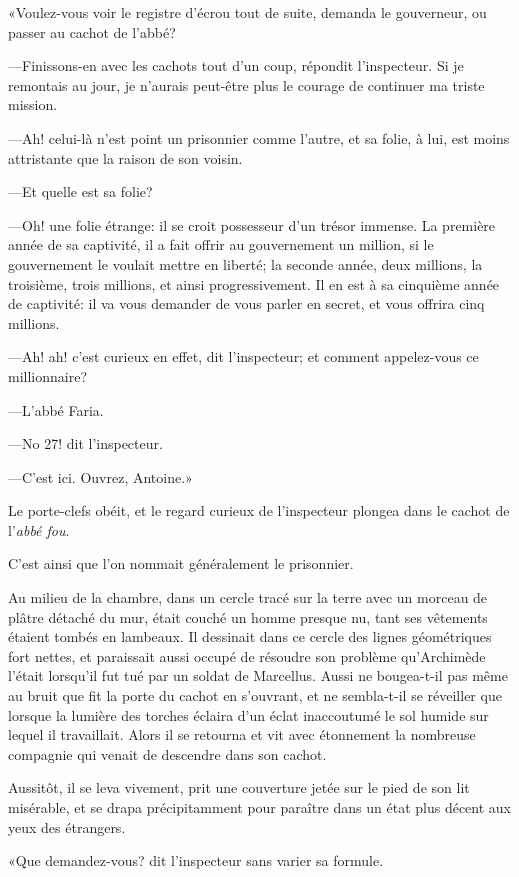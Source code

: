 «Voulez-vous voir le registre d'écrou tout de suite, demanda le gouverneur, ou passer au cachot de l'abbé?

—Finissons-en avec les cachots tout d'un coup, répondit l'inspecteur. Si je remontais au jour, je n'aurais peut-être plus le courage de continuer ma triste mission.

—Ah! celui-là n'est point un prisonnier comme l'autre, et sa folie, à lui, est moins attristante que la raison de son voisin.

—Et quelle est sa folie?

—Oh! une folie étrange: il se croit possesseur d'un trésor immense. La première année de sa captivité, il a fait offrir au gouvernement un million, si le gouvernement le voulait mettre en liberté; la seconde année, deux millions, la troisième, trois millions, et ainsi progressivement. Il en est à sa cinquième année de captivité: il va vous demander de vous parler en secret, et vous offrira cinq millions.

—Ah! ah! c'est curieux en effet, dit l'inspecteur; et comment appelez-vous ce millionnaire?

—L'abbé Faria.

—No 27! dit l'inspecteur.

—C'est ici. Ouvrez, Antoine.»

Le porte-clefs obéit, et le regard curieux de l'inspecteur plongea dans le cachot de l'\textit{abbé fou}.

C'est ainsi que l'on nommait généralement le prisonnier.

Au milieu de la chambre, dans un cercle tracé sur la terre avec un morceau de plâtre détaché du mur, était couché un homme presque nu, tant ses vêtements étaient tombés en lambeaux. Il dessinait dans ce cercle des lignes géométriques fort nettes, et paraissait aussi occupé de résoudre son problème qu'Archimède l'était lorsqu'il fut tué par un soldat de Marcellus. Aussi ne bougea-t-il pas même au bruit que fit la porte du cachot en s'ouvrant, et ne sembla-t-il se réveiller que lorsque la lumière des torches éclaira d'un éclat inaccoutumé le sol humide sur lequel il travaillait. Alors il se retourna et vit avec étonnement la nombreuse compagnie qui venait de descendre dans son cachot.

Aussitôt, il se leva vivement, prit une couverture jetée sur le pied de son lit misérable, et se drapa précipitamment pour paraître dans un état plus décent aux yeux des étrangers.

«Que demandez-vous? dit l'inspecteur sans varier sa formule.

